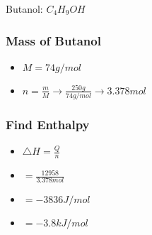 \documentclass[12pt]{article} %
\begin{document}
Butanol: $C_4H_9OH$

\subsubsection*{Mass of Butanol}
\begin{itemize}
\item $M = 74g/mol$
\item $n = \frac{m}{M} \rightarrow \frac{250g}{74g/mol} \rightarrow 3.378mol$
\end{itemize}

\subsubsection*{Find Enthalpy}
\begin{itemize}
\item $\triangle{H} = \frac{Q}{n}$
\item $=\frac{12958}{3.378mol}$
\item $=-3836J/mol$
\item $= -3.8kJ/mol$

\end{itemize}
\end{document}

